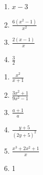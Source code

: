 \begin{respostas}{5}
\begin{multicols}{3}
\begin{enumerate}[label=\alph*)]
            \item $x-3$
            
            \item $\frac{6(x^2-1)}{x^2}$
            
            \item $\frac{2(x-1)}{x}$
            
            \item $\frac{3}{2}$
        \end{enumerate}
    \end{multicols}
    
    \ansitem{} \begin{multicols}{3}
        \begin{enumerate}[label=\alph*)]
            \item $\frac{x^2}{x+1}$
            
            \item $\frac{3x^2+1}{9x^2-1}$
            
            \item $\frac{a+1}{a}$
            
            \item $\frac{y+5}{(2y+5)^2}$
            
            \item $\frac{x^3+2x^2+1}{x}$
            
            \item 1
        \end{enumerate}
    \end{multicols}
\end{respostas}